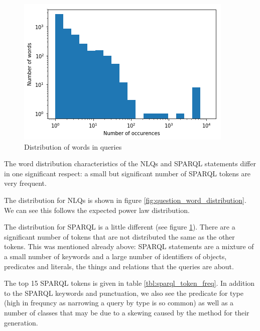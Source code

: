 \documentclass[12pt]{article}
\begin{document}
\begin{figure}
  \centering
  \includegraphics{images/query_word_distribution.png}
  \caption{Distribution of words in queries}
  \label{fig:query_word_distribution}
\end{figure}

The word distribution characteristics of the NLQs and SPARQL statements differ
in one significant respect: a small but significant number of SPARQL tokens
are very frequent.

The distribution for NLQs is shown in figure \ref{fig:question_word_distribution}.
We can see this follows the expected power law distribution.

The distribution for SPARQL is a little different (see figure \ref{fig:query_word_distribution}).
There are a significant number of tokens that are not distributed the same as the other
tokens. This was mentioned already above: SPARQL statements are a mixture of a small number
of keywords and a large number of identifiers of objects, predicates and literals, the things
and relations that the queries are about. 

The top 15 SPARQL tokens is given in table \ref{tbl:sparql_token_freq}. In addition to 
the SPARQL keywords and punctuation, we also see the predicate for type (high in 
frequncy as narrowing a query by type is so common) as well as a number of classes that
may be due to a skewing caused by the method for their generation.
\end{document}
